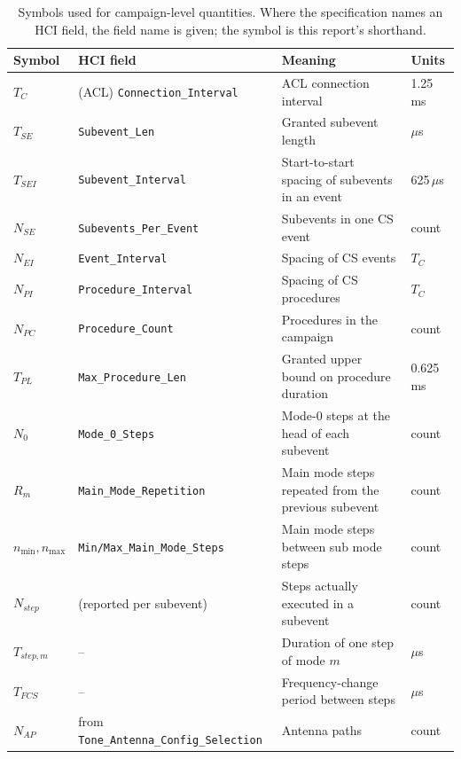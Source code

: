 \documentclass[11pt,a4paper]{article}
\newcommand{\us}{\,\ensuremath{\upmu}s}
\newcommand{\code}[1]{\texttt{\small #1}}
\newcommand{\Tfcs}{T_{FCS}}
\newcommand{\Nap}{N_{AP}}
\newcommand{\Tconn}{T_{C}}
\newcommand{\Tse}{T_{SE}}
\newcommand{\Tsei}{T_{SEI}}
\newcommand{\Nse}{N_{SE}}
\newcommand{\Nei}{N_{EI}}
\newcommand{\Npi}{N_{PI}}
\newcommand{\Npc}{N_{PC}}
\newcommand{\Tpl}{T_{PL}}
\newcommand{\Nst}{N_{step}}
\providecommand{\upmu}{\mu}
\begin{document}
\begin{table}[h]
\caption{Symbols used for campaign-level quantities. Where the specification names an HCI field, the
field name is given; the symbol is this report's shorthand.}
\label{tab:notation}
\centering\small
\begin{tabular}{@{}L{16mm}L{40mm}L{52mm}L{18mm}@{}}
\toprule
Symbol & HCI field & Meaning & Units \\
\midrule
$\Tconn$ & (ACL) \code{Connection\_Interval} & ACL connection interval & 1.25\,ms \\
$\Tse$   & \code{Subevent\_Len}       & Granted subevent length            & \ensuremath{\upmu}s \\
$\Tsei$  & \code{Subevent\_Interval}  & Start-to-start spacing of subevents in an event & 625\us \\
$\Nse$   & \code{Subevents\_Per\_Event} & Subevents in one CS event        & count \\
$\Nei$   & \code{Event\_Interval}     & Spacing of CS events               & $\Tconn$ \\
$\Npi$   & \code{Procedure\_Interval} & Spacing of CS procedures           & $\Tconn$ \\
$\Npc$   & \code{Procedure\_Count}    & Procedures in the campaign         & count \\
$\Tpl$   & \code{Max\_Procedure\_Len} & Granted upper bound on procedure duration & 0.625\,ms \\
$N_0$    & \code{Mode\_0\_Steps}      & Mode-0 steps at the head of each subevent & count \\
$R_m$    & \code{Main\_Mode\_Repetition} & Main mode steps repeated from the previous subevent & count \\
$n_{\min},n_{\max}$ & \code{Min/Max\_Main\_Mode\_Steps} & Main mode steps between sub mode steps & count \\
$\Nst$   & (reported per subevent)    & Steps actually executed in a subevent & count \\
$T_{step,m}$ & --                     & Duration of one step of mode $m$   & \ensuremath{\upmu}s \\
$\Tfcs$  & --                         & Frequency-change period between steps & \ensuremath{\upmu}s \\
$\Nap$   & from \code{Tone\_Antenna\_}\newline\code{Config\_Selection} & Antenna paths & count \\
\bottomrule
\end{tabular}
\end{table}
\end{document}
